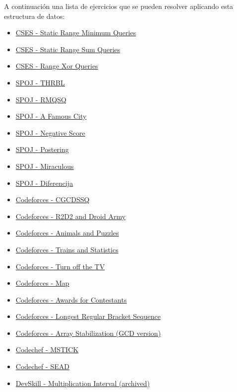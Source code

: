 A continuación una lista de ejercicios que se pueden resolver aplicando esta estructura de datos:

\begin{itemize}
	\item \href{https://cses.fi/problemset/task/1647}{CSES - Static Range Minimum Queries}
	\item \href{https://cses.fi/problemset/task/1646}{CSES - Static Range Sum Queries}
	\item \href{https://cses.fi/problemset/task/1650}{CSES - Range Xor Queries}
	\item \href{http://www.spoj.com/problems/THRBL/}{SPOJ - THRBL}
	\item \href{http://www.spoj.com/problems/RMQSQ/}{SPOJ - RMQSQ}
	\item \href{http://www.spoj.com/problems/CITY2/}{SPOJ - A Famous City}
	\item \href{http://www.spoj.com/problems/RPLN/}{SPOJ - Negative Score}
	\item \href{http://www.spoj.com/problems/POSTERIN/}{SPOJ - Postering}
	\item \href{http://www.spoj.com/problems/TNVFC1M/}{SPOJ - Miraculous}
	\item \href{http://www.spoj.com/problems/DIFERENC/}{SPOJ - Diferencija}
	\item \href{http://codeforces.com/contest/475/problem/D}{Codeforces - CGCDSSQ}
	\item \href{http://codeforces.com/problemset/problem/514/D}{Codeforces - R2D2 and Droid Army}
	\item \href{http://codeforces.com/contest/713/problem/D}{Codeforces - Animals and Puzzles}
	\item \href{http://codeforces.com/contest/675/problem/E}{Codeforces - Trains and Statistics}
	\item \href{http://codeforces.com/contest/863/problem/E}{Codeforces - Turn off the TV}
	\item \href{http://codeforces.com/contest/15/problem/D}{Codeforces - Map}
	\item \href{http://codeforces.com/contest/873/problem/E}{Codeforces - Awards for Contestants}
	\item \href{http://codeforces.com/contest/5/problem/C}{Codeforces - Longest Regular Bracket Sequence}
	\item \href{http://codeforces.com/problemset/problem/1547/F}{Codeforces - Array Stabilization (GCD version)}
	\item \href{https://www.codechef.com/problems/MSTICK}{Codechef - MSTICK}
	\item \href{https://www.codechef.com/problems/SEAD}{Codechef - SEAD}
	\item \href{http://web.archive.org/web/20200922003506/https://devskill.com/CodingProblems/ViewProblem/19}{DevSkill - Multiplication Interval (archived)}
\end{itemize}